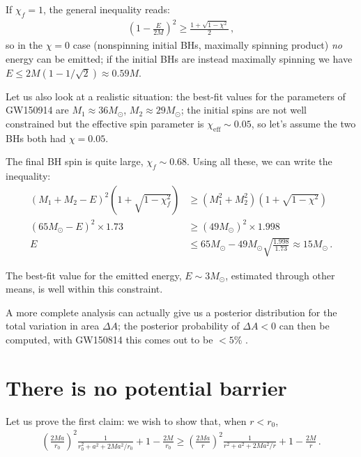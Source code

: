 \documentclass[main.tex]{subfiles}
\begin{document}
If \(\chi _f = 1\), the general inequality reads: 
%
\begin{align}
\left(1 - \frac{E}{2M}\right)^2 \geq \frac{1 + \sqrt{1 - \chi^2}}{2} 
\,,
\end{align}
%
so in the \(\chi = 0\) case (nonspinning initial BHs, maximally spinning product) \emph{no} energy can be emitted; if the initial BHs are instead maximally spinning we have \(E \leq 2M ( 1 - 1/\sqrt{2}) \approx 0.59 M\).

Let us also look at a realistic situation: the best-fit values for the parameters of GW150914 are \(M_1 \approx 36M_{\odot}\), \(M_2 \approx 29M_{\odot}\); the initial spins are not well constrained but the effective spin parameter is \(\chi _{\text{eff}} \sim 0.05\), so let's assume the two BHs both had \(\chi = 0.05\). 

The final BH spin is quite large, \(\chi _f \sim 0.68\). 
Using all these, we can write the inequality: %
\begin{align}
(M_1 + M_2 - E)^2 \left(1 + \sqrt{1 - \chi_f^2}\right) &\geq (M_1^2 + M_2^2 ) \left(1 + \sqrt{1 - \chi^2}\right)  \\
(65 M_{\odot} - E)^2 \times 1.73 &\geq (49 M_{\odot})^2 \times 1.998  \\
E &\leq 65M_{\odot} - 49 M_{\odot} \sqrt{\frac{1.998}{1.73}} \approx 15 M_{\odot}
\,.
\end{align}

The best-fit value for the emitted energy, \(E \sim 3M_{\odot}\), estimated through other means, is well within this constraint.

A more complete analysis can actually give us a posterior distribution for the total variation in area \(\Delta A\); the posterior probability of \(\Delta A < 0\) can then be computed, with GW150814 this comes out to be \(< 5\%\) \cite{isiTestingBlackholeArea2021}.

\appendix

\section{There is no potential barrier} \label{app:potential-barrier}

Let us prove the first claim: we wish to show that, when \(r < r_0 \),
%
\begin{align}
\left(\frac{2Ma}{r_0 }\right)^2 \frac{1}{r_0 ^2 + a^2 + 2Ma^2 /r_0 } +1 - \frac{2M}{r_0 } 
\geq 
\left(\frac{2Ma}{r}\right)^2 \frac{1}{r^2 + a^2 + 2Ma^2 /r} +1 - \frac{2M}{r}
\,.
\end{align}
\end{document}
